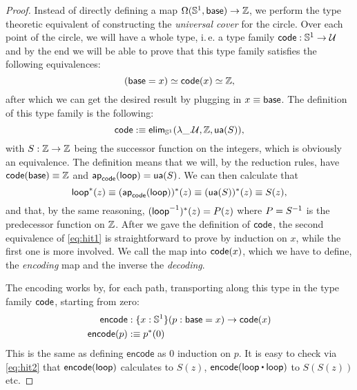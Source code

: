 \begin{proof}
Instead of directly defining a map $\Omega(\mathbb{S}^1, \mathsf{base}) \to \mathbb Z$,
we perform the type theoretic equivalent of constructing the
\emph{universal cover} for the circle.
Over each point of the circle, we will have a whole type, i.\,e. a type family
$\mathsf{code} : \mathbb{S}^1 \to \mathcal{U}$
and by the end we will be able to prove that this type family satisfies the
following equivalences:
\begin{equation}\label{eq:hit1}
(\mathsf{base} = x) \simeq \mathsf{code}(x) \simeq \mathbb Z \text{,}
\end{equation}
after which we can get the desired result by plugging in $x \equiv \mathsf{base}$.
The definition of this type family is the following:
\begin{equation*}
\mathsf{code} :\equiv \mathsf{elim}_{\mathbb{S}^1}(\lambda \_.\mathcal{U}, \mathbb Z, \mathsf{ua}(S)) \text{,}
\end{equation*}
with $S : \mathbb Z \to \mathbb Z$ being the successor function on the integers, which
is obviously an equivalence.
The definition means that we will, by the reduction rules,
have $\mathsf{code}(\mathsf{base}) \equiv \mathbb Z$ and
$\mathsf{ap}_{\mathsf{code}}(\mathsf{loop}) = \mathsf{ua}(S)$.
We can then calculate that
\begin{equation}\label{eq:hit2}
\mathsf{loop}^*(z) \equiv (\mathsf{ap}_{\mathsf{code}}(\mathsf{loop}))^*(z) \equiv (\mathsf{ua}(S))^*(z) \equiv S(z) \text{,}
\end{equation}
and that, by the same reasoning, $(\mathsf{loop}^{-1})^*(z) = P(z)$ where
$P = S^{-1}$ is the predecessor function on $\mathbb Z$.
After we gave the definition of $\mathsf{code}$, the second equivalence of \eqref{eq:hit1}
is straightforward to prove by induction on $x$, while the first one is more involved.
We call the map into $\mathsf{code}(x)$, which we have to define,
the \emph{encoding} map and the inverse the \emph{decoding}.

The encoding works by, for each path, transporting along this type in the type
family $\mathsf{code}$, starting from zero:
\begin{align*}
\mathsf{encode} &: \{x : \mathbb{S}^1\}(p : \mathsf{base} = x) \to \mathsf{code}(x) \\
\mathsf{encode}(p) &:\equiv p^*(0)
\end{align*}
This is the same as defining $\mathsf{encode}$ as $0$ induction on $p$.
It is easy to check via \eqref{eq:hit2} that $\mathsf{encode}(\mathsf{loop})$
calculates to $S(z)$, $\mathsf{encode}(\Sloop \ct \Sloop)$ to
$S(S(z))$ etc.


\end{proof}
